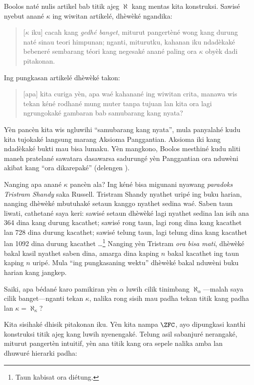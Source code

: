 \documentclass[../../../include/open-logic-section]{subfiles}
\begin{document}
Boolos naté nulis artikel bab titik ajeg $\aleph$ kang mentas kita
konstruksi. Sawisé nyebut anané $\kappa$ ing wiwitan artikelé,
dhèwèké ngandika:
\begin{quote}
	[$\kappa$ iku] cacah kang \emph{gedhé banget}, miturut pangertèné
	wong kang durung naté sinau teori himpunan; nganti, miturutku,
	kahanan iku ndadèkaké bebeneré sembarang téori kang negesaké
	anané paling ora $\kappa$ obyèk dadi pitakonan.
	\citep[kaca~257]{Boolos2000}
\end{quote}
Ing pungkasan artikelé dhèwèké takon:
\begin{quote}
	[apa] kita curiga yèn, apa waé kahanané ing wiwitan crita,
	manawa wis tekan kéné rodhané mung muter tanpa tujuan lan
	kita ora lagi ngrungokaké gambaran bab samubarang kang nyata?
	\citep[kaca~268]{Boolos2000}
\end{quote}
Yèn pancèn kita wis ngluwihi ``samubarang kang nyata'', mula
panyalahé kudu kita tujokaké langsung marang Aksioma Panggantian.
Aksioma iki kang ndadèkaké bukti mau bisa lumaku. Yèn mangkono,
Boolos mesthiné kudu nliti maneh pratelané sawatara dasawarsa
sadurungé yèn Panggantian ora nduwèni akibat kang ``ora dikarepaké''
(delengen ).

Nanging apa anané $\kappa$ pancèn ala? Ing kéné bisa migunani
nyawang \emph{paradoks Tristram Shandy} saka Russell. Tristram Shandy
nyathet uripé ing buku harian, nanging dhèwèké mbutuhaké setaun kanggo
nyathet sedina waé. Saben taun liwati, cathetané saya keri: sawisé
setaun dhèwèké lagi nyathet sedina lan isih ana 364 dina kang durung
kacathet; sawisé rong taun, lagi rong dina kang kacathet lan 728 dina
durung kacathet; sawisé telung taun, lagi telung dina kang kacathet
lan 1092 dina durung kacathet \dots\footnote{Taun kabisat ora diétung.}
Nanging yèn Tristram \emph{ora bisa mati}, dhèwèké bakal kasil
nyathet saben dina, amarga dina kaping $n$ bakal kacathet ing taun
kaping $n$ uripé. Mula ``ing pungkasaning wektu'' dhèwèké bakal
nduwèni buku harian kang jangkep.

Saiki, apa bédané karo pamikiran yèn $\alpha$ luwih cilik tinimbang
$\aleph_\alpha$---malah saya cilik banget---nganti tekan $\kappa$,
nalika rong sisih mau padha tekan titik kang padha lan $\kappa
= \aleph_\kappa$?

Kita sisihaké dhisik pitakonan iku. Yèn kita nampa $\ZFC$, ayo
dipungkasi kanthi konstruksi titik ajeg kang luwih nyenengaké.
Telung asil sabanjuré nerangaké, miturut pangertèn intuitif, yèn
ana titik kang ora sepele nalika amba lan dhuwuré hierarki padha:
\end{document}
